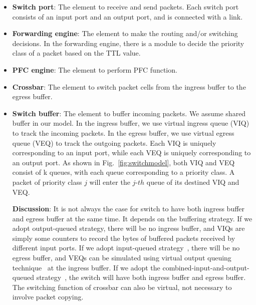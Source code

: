 \begin{itemize}
	\item \textbf{Switch port}: The element to receive and send packets. Each switch port consists of an input port and an output port, and is connected with a link.
	
	\item \textbf{Forwarding engine}: The element to make the routing and/or switching decisions. In the forwarding engine, there is a module to decide the priority class of a packet based on the TTL value. 
	
	\item \textbf{PFC engine}: The element to perform PFC function.
	
	\item \textbf{Crossbar}: The element to switch packet cells from the ingress buffer to the egress buffer. 
	
	\item \textbf{Switch buffer}: The element to buffer incoming packets. We assume shared buffer in our model. In the ingress buffer, we use  virtual ingress queue (VIQ) to track the incoming packets. In the egress buffer, we use virtual egress queue (VEQ) to track the outgoing packets. Each VIQ is uniquely corresponding to an input port, while each VEQ is uniquely corresponding to an output port. As shown in Fig.~\ref{fig:switchmodel}, both VIQ and VEQ consist of k queues, with each queue corresponding to a priority class. A packet of priority class $j$ will enter the $j$-$th$ queue of its destined VIQ and VEQ.
	
	
	\textbf{Discussion}: It is not always the case for switch to have both ingress buffer and egress buffer at the same time. It depends on the buffering strategy. If we adopt output-queued strategy, there will be no ingress buffer, and VIQs are simply some counters to record the bytes of buffered packets received by different input ports. If we adopt input-queued strategy~\cite{islip}, there will be no egress buffer, and VEQs can be simulated using virtual output	queuing technique~\cite{tinytera} at the ingress buffer. If we adopt the combined-input-and-output-queued strategy~\cite{chuang1999matching}, the switch will have both ingress buffer and egress buffer. The switching function of crossbar can also be virtual, not necessary to involve packet copying.

\end{itemize}

